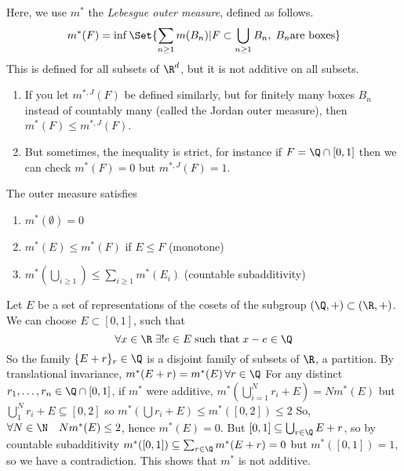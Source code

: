 \documentclass{article}
\begin{document}
Here, we use $m^*$ the \emph{Lebesgue outer measure}, defined as follows.
\begin{equation*}
    m^*(F) = \inf\Set{\sum_{n \geq 1} m(B_n) | F \subset \bigcup_{n \geq 1} B_n, \; B_n \textrm{are boxes}}
\end{equation*}
This is defined for all subsets of $\R^d$, but it is not additive on all subsets.
\begin{remark}
    \leavevmode
    \begin{enumerate}
        \item If you let $m^{*, J}(F)$ be defined similarly, but for finitely many boxes $B_n$ instead of countably many (called the Jordan outer measure), then $m^*(F) \leq m^{*, J}(F)$.
        \item But sometimes, the inequality is strict, for instance if $F = \Q \cap [0, 1]$ then we can check $m^*(F) = 0$ but $m^{*, J}(F) = 1$.
    \end{enumerate}
    The outer measure satisfies
    \begin{enumerate}
        \item $m^*(\emptyset) = 0$
        \item $m^*(E) \leq m^*(F)$ if $E \leq F$ (monotone)
        \item $m^*(\bigcup_{i \geq 1}) \leq \sum_{i \geq 1} m^* (E_i)$ (countable subadditivity)
    \end{enumerate}
\end{remark}

\begin{eg}
    Let $E$ be a set of representations of the cosets of the subgroup $(\Q, +) \subset (\R, +)$. We can choose $E \subset [0, 1]$, such that
    \begin{equation}
        \forall x \in \R \; \exists! e \in E \; \text{such that} \; x - e \in \Q
    \end{equation}
    So the family $\{E + r\}_r \in \Q$ is a disjoint family of subsets of $\R$, a partition.
    By translational invariance, $m^*(E + r) = m^*(E) \,\forall r \in \Q$
    For any distinct $r_1, \dotsc, r_n \in \Q \cap [0, 1]$, if $m^*$ were additive, $m^*(\bigcup_{i=1}^N r_i + E) = N m^*(E)$ but $\bigcup_{1}^N r_i + E \subseteq [0, 2]$ so $m^*(\bigcup r_i + E) \leq m^*([0, 2]) \leq 2$
    So, $\forall N \in \N \quad N m^*(E) \leq 2$, hence $m^*(E) = 0$.
    But $[0, 1] \subseteq \bigcup_{r \in \Q} E + r$, so by countable subadditivity $m^*([0, 1]) \subseteq \sum_{r \in \Q} m^*(E + r) = 0$ but $m^*([0, 1]) = 1$, so we have a contradiction.
    This shows that $m^*$ is not additive.
\end{eg}
\end{document}
